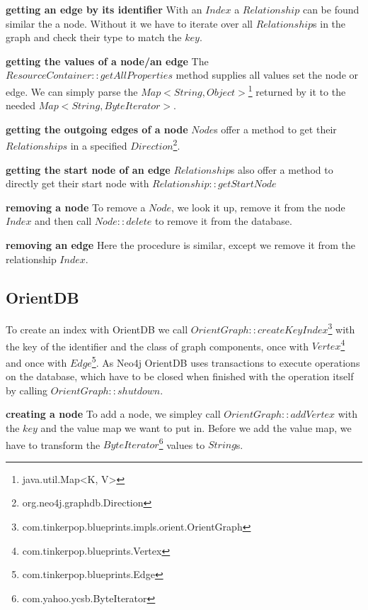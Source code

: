 \textbf{getting an edge by its identifier} \newline
With an $ Index $ a $ Relationship $ can be found similar the a node.
Without it we have to iterate over all $ Relationship $s in the graph and check their type to match the $ key $.

\textbf{getting the values of a node/an edge} \newline
The $ ResourceContainer::getAllProperties $ method supplies all values set the node or edge.
We can simply parse the $ Map<String, Object> $\footnote{java.util.Map<K, V>} returned by it to the needed $ Map<String, ByteIterator> $.

\textbf{getting the outgoing edges of a node} \newline
$ Node $s offer a method to get their $ Relationships $ in a specified $ Direction $\footnote{org.neo4j.graphdb.Direction}.

\textbf{getting the start node of an edge} \newline
$ Relationship $s also offer a method to directly get their start node with $ Relationship::getStartNode $

\textbf{removing a node} \newline
To remove a $ Node $,
we look it up,
remove it from the node $ Index $ and then call $ Node::delete $ to remove it from the database.

\textbf{removing an edge} \newline
Here the procedure is similar,
except we remove it from the relationship $ Index $.

\subsection{OrientDB}
To create an index with OrientDB we call $ OrientGraph::createKeyIndex $\footnote{com.tinkerpop.blueprints.impls.orient.OrientGraph} with the key of the identifier and the class of graph components,
once with $ Vertex $\footnote{com.tinkerpop.blueprints.Vertex} and once with $ Edge $\footnote{com.tinkerpop.blueprints.Edge}.
As Neo4j OrientDB uses transactions to execute operations on the database,
which have to be closed when finished with the operation itself by calling $ OrientGraph::shutdown $.

\textbf{creating a node} \newline
To add a node,
we simpley call $ OrientGraph::addVertex $ with the $ key $ and the value map we want to put in.
Before we add the value map,
we have to transform the $ ByteIterator $\footnote{com.yahoo.ycsb.ByteIterator} values to $ String $s.

